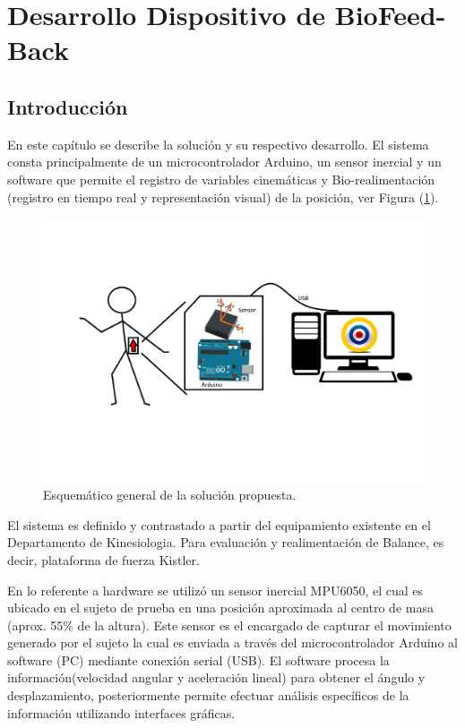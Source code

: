 \documentclass[12pt,a4paper]{article}
\newcommand{\nombreDispositivo}{Dispositivo de BioFeed-Back }
\begin{document}
\section{Desarrollo \nombreDispositivo}
\subsection{Introducción}
En este capítulo se describe la solución y su respectivo desarrollo.
El sistema consta principalmente de un microcontrolador Arduino, un sensor inercial y un software que permite el registro de variables cinemáticas y Bio-realimentación (registro en tiempo real y representación visual) de la posición, ver Figura (\ref{fig:diagramasistema}).

\begin{figure}[H]
	\centering
	\includegraphics[scale=0.25]{images/diagrama_sistema}
	\caption{Esquemático general de la solución propuesta.}
	\label{fig:diagramasistema}
\end{figure}

El sistema es definido y contrastado a partir del equipamiento existente en el Departamento de Kinesiologia. Para evaluación y realimentación de Balance, es decir, plataforma de fuerza Kistler.

En lo referente a hardware se utilizó un sensor inercial MPU6050, el cual es ubicado en el sujeto de prueba en una posición aproximada al centro de masa (aprox. 55\% de la altura). Este sensor es el encargado de capturar el movimiento generado por el sujeto la cual es  enviada a través del microcontrolador Arduino al software (PC) mediante conexión serial (USB). El software procesa la información(velocidad angular y aceleración lineal) para obtener el ángulo y desplazamiento, posteriormente permite efectuar análisis específicos de la información utilizando interfaces gráficas.
\end{document}
